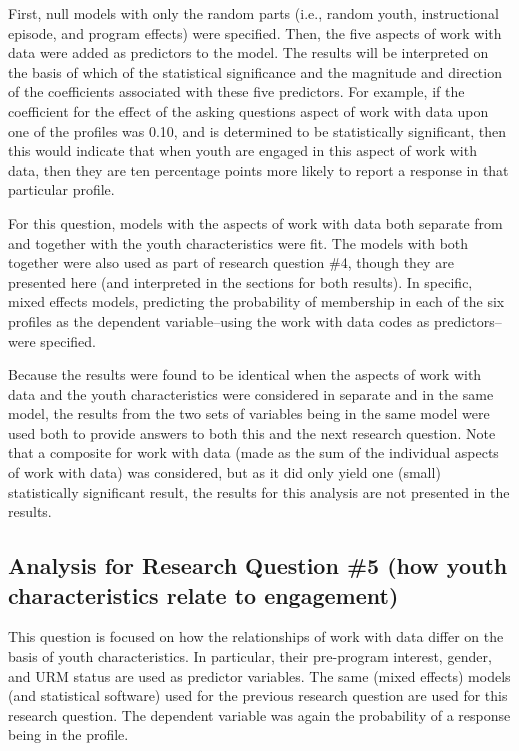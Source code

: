\documentclass[]{msu-thesis}
\theoremstyle{definition}
\theoremstyle{definition}
\theoremstyle{definition}
\theoremstyle{remark}
\begin{document}
First, null models with only the random parts (i.e., random youth,
instructional episode, and program effects) were specified. Then, the
five aspects of work with data were added as predictors to the model.
The results will be interpreted on the basis of which of the statistical
significance and the magnitude and direction of the coefficients
associated with these five predictors. For example, if the coefficient
for the effect of the asking questions aspect of work with data upon one
of the profiles was 0.10, and is determined to be statistically
significant, then this would indicate that when youth are engaged in
this aspect of work with data, then they are ten percentage points more
likely to report a response in that particular profile.

For this question, models with the aspects of work with data both
separate from and together with the youth characteristics were fit. The
models with both together were also used as part of research question
\#4, though they are presented here (and interpreted in the sections for
both results). In specific, mixed effects models, predicting the
probability of membership in each of the six profiles as the dependent
variable--using the work with data codes as predictors--were specified.

Because the results were found to be identical when the aspects of work
with data and the youth characteristics were considered in separate and
in the same model, the results from the two sets of variables being in
the same model were used both to provide answers to both this and the
next research question. Note that a composite for work with data (made
as the sum of the individual aspects of work with data) was considered,
but as it did only yield one (small) statistically significant result,
the results for this analysis are not presented in the results.

\subsection{Analysis for Research Question \#5 (how youth
characteristics relate to
engagement)}\label{analysis-for-research-question-5-how-youth-characteristics-relate-to-engagement}

This question is focused on how the relationships of work with data
differ on the basis of youth characteristics. In particular, their
pre-program interest, gender, and URM status are used as predictor
variables. The same (mixed effects) models (and statistical software)
used for the previous research question are used for this research
question. The dependent variable was again the probability of a response
being in the profile.
\end{document}
